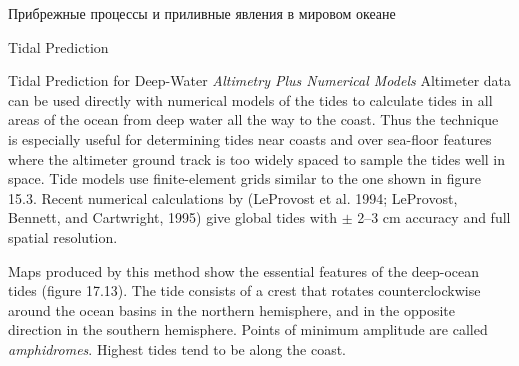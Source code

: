 \begin{chapter}{Прибрежные процессы и приливные явления в мировом океане}
\begin{section}{Tidal Prediction}
\begin{paragraph}{Tidal Prediction for Deep-Water}
\textit{Altimetry Plus Numerical Models} Altimeter data can be used
directly with 
 numerical models of the tides to calculate
tides in all areas of the ocean from deep water all the way to the
coast. Thus the technique is especially useful for determining tides
near coasts and over sea-floor features where the altimeter ground
track is too widely spaced to sample the tides well in space. Tide
models use finite-element grids similar to the one shown in figure
15.3. Recent numerical calculations by (LeProvost et al. 1994;
LeProvost, Bennett, and Cartwright, 1995) give global tides with $\pm$
2--3 cm accuracy and full spatial resolution.
%

Maps produced by this method show the essential features of the
deep-ocean tides (figure 17.13). The tide consists of a crest that
rotates counterclockwise around the ocean basins in the northern
hemisphere, and in the opposite direction in the southern
hemisphere. Points of minimum amplitude are called
\textit{amphidromes}.
Highest tides tend to be along the coast.
%


\end{paragraph}
\end{section}
\end{chapter}

